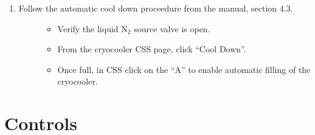 \documentclass[letterpaper,10pt,english]{sphinxmanual}
\begin{document}
\begin{enumerate}
\begin{description}
\begin{itemize}
\item {} 
\sphinxAtStartPar
Open V19 to start filling the sub\sphinxhyphen{}cooler.

\item {} 
\sphinxAtStartPar
Close V19 when the sub\sphinxhyphen{}cooler reaches 15\%.

\item {} 
\sphinxAtStartPar
Open heater vessel valve to start filling the heater vessel.

\item {} 
\sphinxAtStartPar
Close heater vessel valve when level reaches 20\%.

\end{itemize}

\end{description}

\item {} \begin{description}
\item[{Follow the automatic cool down proceedure from the manual, section 4.3.}] \leavevmode\begin{itemize}
\item {} 
\sphinxAtStartPar
Verify the liquid N$_{\text{2}}$ source valve is open.

\item {} 
\sphinxAtStartPar
From the cryocooler CSS page, click “Cool Down”.

\item {} 
\sphinxAtStartPar
Once full, in CSS click on the “A” to enable automatic filling of the cryocooler.

\end{itemize}

\end{description}

\end{enumerate}


\section{Controls}
\label{\detokenize{staff:controls}}
\end{document}
